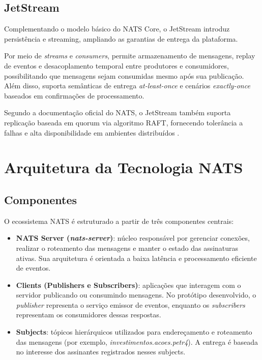 \subsection{JetStream}
Complementando o modelo básico do NATS Core, o JetStream introduz persistência e streaming, ampliando as garantias de entrega da plataforma.

Por meio de \textit{streams} e \textit{consumers}, permite armazenamento de mensagens, replay de eventos e desacoplamento temporal entre produtores e consumidores, possibilitando que mensagens sejam consumidas mesmo após sua publicação. Além disso, suporta semânticas de entrega \textit{at-least-once} e cenários \textit{exactly-once} baseados em confirmações de processamento.

Segundo a documentação oficial do NATS, o JetStream também suporta replicação baseada em quorum via algoritmo RAFT, fornecendo tolerância a falhas e alta disponibilidade em ambientes distribuídos \cite{nats_jetstream}.

\section{Arquitetura da Tecnologia NATS}
\label{fundamentacao}


\subsection{Componentes}
\label{fundamentacao}
O ecossistema NATS é estruturado a partir de três componentes centrais:

\begin{itemize}

\item \textbf{NATS Server (\textit{nats-server})}: núcleo responsável por gerenciar conexões, realizar o roteamento das mensagens e manter o estado das assinaturas ativas. Sua arquitetura é orientada a baixa latência e processamento eficiente de eventos.

\item \textbf{Clients (Publishers e Subscribers)}: aplicações que interagem com o servidor publicando ou consumindo mensagens. No protótipo desenvolvido, o \textit{publisher} representa o serviço emissor de eventos, enquanto os \textit{subscribers} representam os consumidores dessas respostas.

\item \textbf{Subjects}: tópicos hierárquicos utilizados para endereçamento e roteamento das mensagens (por exemplo, \textit{investimentos.acoes.petr4}). A entrega é baseada no interesse dos assinantes registrados nesses subjects.

\end{itemize}

